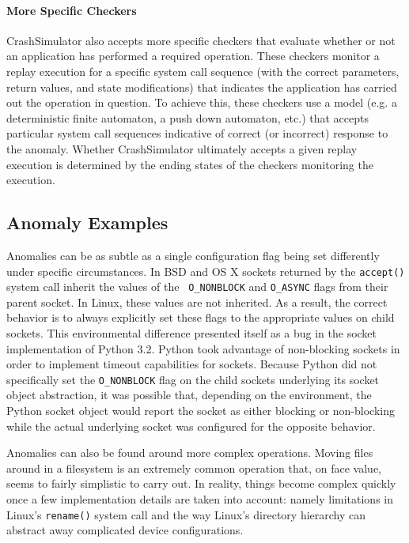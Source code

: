     \paragraph{More Specific Checkers}

    CrashSimulator also accepts more specific checkers that evaluate whether or
    not an application has performed a required operation.  These checkers
    monitor a replay execution for a specific system call sequence (with the
    correct parameters, return values, and state modifications) that indicates
    the application has carried out the operation in question.  To achieve this,
    these checkers use a model (e.g. a deterministic finite
    automaton, a push down automaton, etc.) that accepts particular system
    call sequences indicative of correct (or incorrect) response
    to the anomaly.  Whether CrashSimulator
    ultimately accepts a given replay execution is determined by the ending
    states of the checkers monitoring the execution.


    \subsection{Anomaly Examples}
    \label{subsec:anomalyexamples}
    Anomalies can be as subtle as a single configuration flag being set
    differently under specific circumstances.  In BSD and OS X sockets returned
    by the {\tt accept()} system call inherit the values of the {\tt
      O\_NONBLOCK} and {\tt O\_ASYNC} flags from their parent socket.  In Linux,
    these values are not inherited.  As a result, the correct behavior is to
    always explicitly set these flags to the appropriate values on child
    sockets.  This environmental difference presented itself as a bug
    in the socket implementation of Python 3.2.  Python took advantage of
    non-blocking sockets in order to implement timeout capabilities for sockets.
    Because Python did not specifically set the {\tt O\_NONBLOCK} flag on the
    child sockets underlying its socket object abstraction, it was possible that,
    depending on the environment, the Python socket object would report the
    socket as either blocking or non-blocking while the actual underlying socket
    was configured for the opposite behavior.

    Anomalies can also be found around more complex operations.  Moving files
    around in a filesystem is an extremely common operation that, on face value,
    seems to fairly simplistic to carry out.  In reality, things become complex
    quickly once a few implementation details are taken into account: namely
    limitations in Linux's {\tt rename()} system call and the way Linux's
    directory hierarchy can abstract away complicated device configurations.

